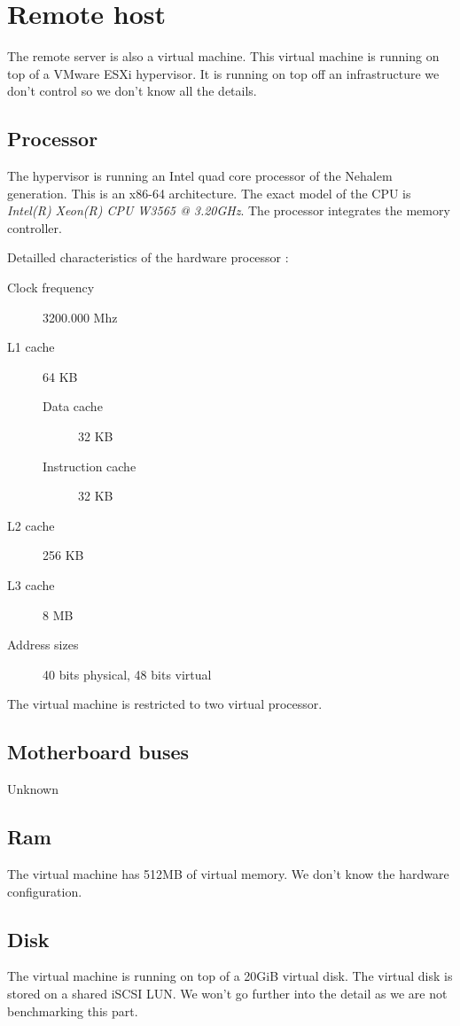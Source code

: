 \appendix
\appendixpage
\addappheadtotoc

\section{Remote host\label{sec:app-remotehost}}
The remote server is also a virtual machine.
This virtual machine is running on top of a VMware ESXi hypervisor.
It is running on top off an infrastructure we don't control so we don't know all
the details.

\subsection{Processor}
The hypervisor is running an Intel quad core processor of the Nehalem generation.
This is an x86-64 architecture.
The exact model of the CPU is \emph{Intel(R) Xeon(R) CPU W3565 @ 3.20GHz}.
\cite{intel-xeon-3565}
The processor integrates the memory controller.

Detailled characteristics of the hardware processor :
\begin{description}
\item[Clock frequency] 3200.000 Mhz
\item[L1 cache] 64 KB
\begin{description}
\item[Data cache] 32 KB
\item[Instruction cache] 32 KB
\end{description}
\item[L2 cache] 256 KB
\item[L3 cache] 8 MB
\item[Address sizes] 40 bits physical, 48 bits virtual
\end{description}
The virtual machine is restricted to two virtual processor.

\subsection{Motherboard buses}
Unknown

\subsection{Ram}
The virtual machine has 512MB of virtual memory.
We don't know the hardware configuration.

\subsection{Disk}
The virtual machine is running on top of a 20GiB virtual disk.
The virtual disk is stored on a shared iSCSI LUN.
We won't go further into the detail as we are not benchmarking this part.

